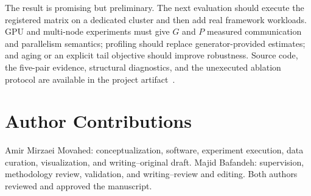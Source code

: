 \documentclass[10pt,journal,compsoc]{IEEEtran}
\begin{document}
The result is promising but preliminary. The next evaluation should execute the registered matrix on a dedicated cluster and then add real framework workloads. GPU and multi-node experiments must give $G$ and $P$ measured communication and parallelism semantics; profiling should replace generator-provided estimates; and aging or an explicit tail objective should improve robustness. Source code, the five-pair evidence, structural diagnostics, and the unexecuted ablation protocol are available in the project artifact~\cite{kubeml2026artifact}.

\section*{Author Contributions}
Amir Mirzaei Movahed: conceptualization, software, experiment execution, data curation, visualization, and writing--original draft. Majid Bafandeh: supervision, methodology review, validation, and writing--review and editing. Both authors reviewed and approved the manuscript.



\end{document}
